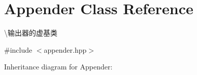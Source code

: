 \hypertarget{classAppender}{}\section{Appender Class Reference}
\label{classAppender}


\textbackslash{}输出器的虚基类  




{\ttfamily \#include $<$appender.\+hpp$>$}



Inheritance diagram for Appender\+:
